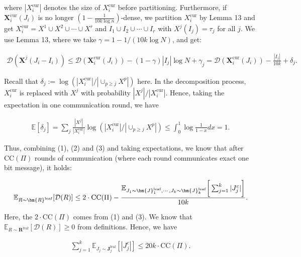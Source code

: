\documentclass[10pt,a4paper]{article}
\begin{document}
where $|X_{i}^{\text{cur}}|$ denotes the size of $X_{i}^{\text{cur}}$ before partitioning. Furthermore, if $\bm{X}_{i}^{\text{cur}}(J_{i})$ is no longer $(1-\frac{1}{10k\log n})$-dense, we partition $X_{i}^{\text{cur}}$ by Lemma 13 and get $X_{i}^{\text{cur}}=X^{1}\cup X^{2}\cup\cdots\cup X^{r}$ and $I_{1}\cup I_{2}\cup\cdots\cup I_{r}$ with $X^{j}(I_{j})=\tau_{j}$ for all $j$. We use Lemma 13, where we take $\gamma=1-1/(10k\log N)$, and get:\par


\[\begin{gathered}
\mathcal{D}(\bm{X}^{j}(J_{i}-I_{i}))\leq\mathcal{D}(\bm{X}_{i}^{\text{cur}}(J_{i}))-(1-\gamma)|I_{j}|\log N+\gamma_{j}=\mathcal{D}(\bm{X}_{i}^{\text{cur}}(J_{i}))-\frac{|I_{j}|}{10k}+\delta_{j}.
\end{gathered}\]


Recall that $\delta_{j}:=\log(|X_{i}^{\text{cur}}|/|\cup_{p\geq j}X^{p}|)$ here. In the decomposition process, $X_{i}^{\text{cur}}$ is replaced with $X^{j}$ with probability $|X^{j}|/|X_{i}^{\text{cur}}|$. Hence, taking the expectation in one communication round, we have\par


\[\begin{gathered}
\mathbb{E}[\delta_{j}]=\sum_{j}\frac{|X^{j}|}{|X_{i}^{\text{cur}}|}\log(|X_{i}^{\text{cur}}|/|\cup_{p\geq j}X^{p}|)\leq\int_{0}^{1}\log\frac{1}{1-x}dx=1.
\end{gathered}\]


Thus, combining (1), (2) and (3) and taking expectations, we know that after $\text{CC}(\Pi)$ rounds of communication (where each round communicates exact one bit message), it holds:\par


\[\begin{gathered}
\mathbb{E}_{R\sim\bm{R}^{\text{leaf}}}[\mathcal{D}(R)]\leq 2\cdot\text{CC}(\Pi)-\frac{\mathbb{E}_{J_{1}\sim\bm{J}_{1}^{\text{leaf}},\cdots,J_{k}\sim\bm{J}_{k}^{\text{leaf}}}\bigg{[}\sum_{j=1}^{k}|J_{j}^{c}|\bigg{]}}{10k}.
\end{gathered}\]


Here, the $2\cdot\text{CC}(\Pi)$ comes from (1) and (3). We know that $\mathbb{E}_{R\sim\bm{R}^{\text{leaf}}}[\mathcal{D}(R)]\geq 0$ from definitions. Hence, we have\par


\[\begin{gathered}
\sum_{j=1}^{k}\mathbb{E}_{J_{j}\sim\bm{J}_{j}^{\text{leaf}}}[|J_{j}^{c}|]\leq 20k\cdot\text{CC}(\Pi).
\end{gathered}\]
\end{document}
